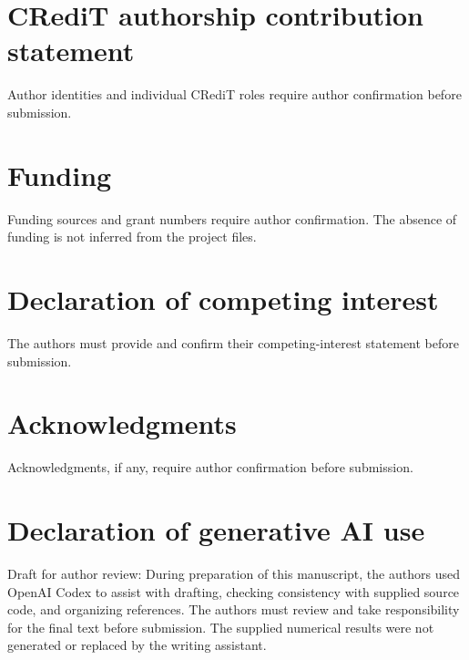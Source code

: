 \documentclass[review,12pt]{elsarticle}
\begin{document}
\section*{CRediT authorship contribution statement}
Author identities and individual CRediT roles require author confirmation before submission.

\section*{Funding}
Funding sources and grant numbers require author confirmation. The absence of funding is not inferred from the project files.

\section*{Declaration of competing interest}
The authors must provide and confirm their competing-interest statement before submission.

\section*{Acknowledgments}
Acknowledgments, if any, require author confirmation before submission.

\section*{Declaration of generative AI use}
Draft for author review: During preparation of this manuscript, the authors used OpenAI Codex to assist with drafting, checking consistency with supplied source code, and organizing references. The authors must review and take responsibility for the final text before submission. The supplied numerical results were not generated or replaced by the writing assistant.



\end{document}
